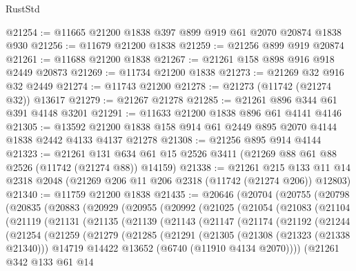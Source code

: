 \begin{lexlean}{RustStd}
\begin{coremodule}
@21254 := @11665 @21200 @1838 @397 @899 @919 @61 @2070 @20874 @1838 @930
@21256 := @11679 @21200 @1838
@21259 := @21256 @899 @919 @20874
@21261 := @11688 @21200 @1838
@21267 := @21261 @158 @898 @916 @918 @2449 @20873
@21269 := @11734 @21200 @1838
@21273 := @21269 @32 @916 @32 @2449
@21274 := @11743 @21200
@21278 := @21273 (@11742 (@21274 @32)) @13617
@21279 := @21267 @21278
@21285 := @21261 @896 @344 @61 @391 @4148 @3201
@21291 := @11633 @21200 @1838 @896 @61 @4141 @4146
@21305 := @13592 @21200 @1838 @158 @914 @61 @2449 @895 @2070 @4144 @1838 @2442 @4133 @4137 @21278
@21308 := @21256 @895 @914 @4144
@21323 := @21261
    @131
    @634
    @61
    @15
    @2526
    @3411
    (@21269 @88 @61 @88 @2526 (@11742 (@21274 @88)) @14159)
@21338 := @21261
    @215
    @133
    @11
    @14
    @2318
    @2048
    (@21269 @206 @11 @206 @2318 (@11742 (@21274 @206)) @12803)
@21340 := @11759 @21200 @1838
@21435 := @20646
    (@20704
      (@20755
        (@20798
          (@20835
            (@20883
              (@20929
                (@20955
                  (@20992
                    (@21025
                      (@21054
                        (@21083
                          (@21104
                            (@21119
                              (@21131
                                (@21135
                                  (@21139
                                    (@21143
                                      (@21147
                                        (@21174
                                          (@21192
                                            (@21244
                                              (@21254
                                                (@21259
                                                  (@21279
                                                    (@21285
                                                      (@21291
                                                        (@21305
                                                          (@21308 (@21323 (@21338 @21340)))
                                                          @14719
                                                          @14422
                                                          @13652
                                                          (@6740 (@11910 @4134 @2070))))
                                                      (@21261
                                                        @342
                                                        @133
                                                        @61
                                                        @14

\end{coremodule}
\end{lexlean}
